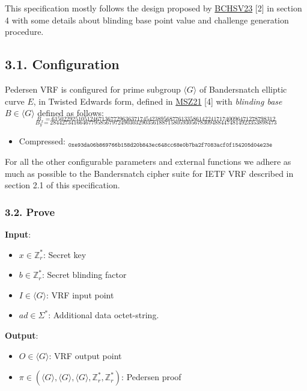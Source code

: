\documentclass[
]{article}
\providecommand{\tightlist}{%
  \setlength{\itemsep}{0pt}\setlength{\parskip}{0pt}}
\begin{document}
This specification mostly follows the design proposed by
\href{https://eprint.iacr.org/2023/002}{BCHSV23} {[}2{]} in section 4
with some details about blinding base point value and challenge
generation procedure.

\subsection{3.1. Configuration}\label{configuration-1}

Pedersen VRF is configured for prime subgroup \(\langle G \rangle\) of
Bandersnatch elliptic curve \(E\), in Twisted Edwards form, defined in
\href{https://eprint.iacr.org/2021/1152}{MSZ21} {[}4{]} with
\emph{blinding base} \(B \in \langle G \rangle\) defined as follows:
\[_{B_x = 6150229251051246713677296363717454238956877613358614224171740096471278798312}\]
\[_{B_y = 28442734166467795856797249030329035618871580593056783094884474814923353898473}\]

\begin{itemize}
\tightlist
\item
  Compressed:
  \(_{\texttt{0xe93da06b869766b158d20b843ec648cc68e0b7ba2f7083acf0f154205d04e23e}}\)
\end{itemize}

For all the other configurable parameters and external functions we
adhere as much as possible to the Bandersnatch cipher suite for IETF VRF
described in section 2.1 of this specification.

\subsubsection{3.2. Prove}\label{prove-1}

\textbf{Input}:

\begin{itemize}
\tightlist
\item
  \(x \in \mathbb{Z}^*_r\): Secret key
\item
  \(b \in \mathbb{Z}^*_r\): Secret blinding factor
\item
  \(I \in \langle G \rangle\): VRF input point
\item
  \(ad \in \Sigma^*\): Additional data octet-string.
\end{itemize}

\textbf{Output}:

\begin{itemize}
\tightlist
\item
  \(O \in \langle G \rangle\): VRF output point
\item
  \(\pi \in (\langle G \rangle, \langle G \rangle, \langle G \rangle, \mathbb{Z}^*_r, \mathbb{Z}^*_r)\):
  Pedersen proof
\end{itemize}
\end{document}
